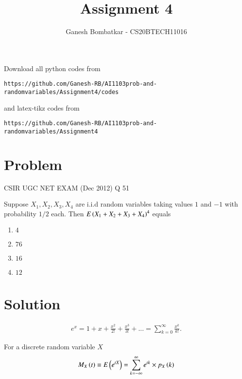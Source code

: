 \documentclass[journal,12pt,twocolumn]{IEEEtran}
\begin{document}
     \def\rightbox#1{\makebox[0in][r]{#1}}
     \def\centbox#1{\makebox[0in]{#1}}
     \def\topbox#1{\raisebox{-\baselineskip}[0in][0in]{#1}}
     \def\midbox#1{\raisebox{-0.5\baselineskip}[0in][0in]{#1}}
\vspace{3cm}
\title{Assignment 4}
\author{Ganesh Bombatkar - CS20BTECH11016}
\maketitle
\newpage
\bigskip
\renewcommand{\thefigure}{\theenumi}
\renewcommand{\thetable}{\theenumi}
Download all python codes from 
\begin{lstlisting}
https://github.com/Ganesh-RB/AI1103prob-and-randomvariables/Assignment4/codes
\end{lstlisting}
%
and latex-tikz codes from 
%
\begin{lstlisting}
https://github.com/Ganesh-RB/AI1103prob-and-randomvariables/Assignment4
\end{lstlisting}

\section{Problem}
{
\centering CSIR UGC NET EXAM (Dec 2012) Q 51

}
Suppose $X_1,X_2,X_3,X_4$ are i.i.d random variables taking values $1$ and $-1$ with probability $1/2$ each. Then $E\left(X_1+X_2 +X_3 +X_4\right)^4$ equals
\begin{multicols}{4}
\begin{enumerate}
    \item $4$
    \item $76$
    \item $16$
    \item $12$
\end{enumerate}
\end{multicols}

\section{Solution}
\begin{definition}
\begin{align}
e^x=1+x+\frac{x^2}{2!}+\frac{x^3}{3!}+...=\sum_{k=0}^{\infty} \frac{x^k}{k!}.
\end{align}
\label{def-MGF}
\end{definition}

\begin{definition}
    For a discrete random variable $X$  
    \begin{align}
        M_{X}\left(t\right) \equiv E\left(e^{t X}\right) = \sum_{k=-\infty}^{\infty} e^{t k}\times p_X\left(k\right)
    \end{align}
\end{definition}
\end{document}
